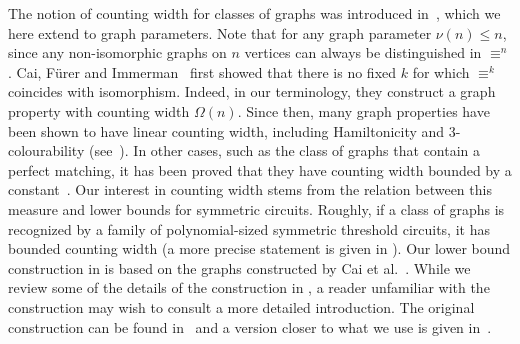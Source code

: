 \documentclass{toc}
\begin{document}
The notion of counting width for classes of
graphs was introduced in~\cite{DawarW17}, which we here extend to graph
parameters. Note that for any graph parameter $\nu(n) \leq n$, since
any non-isomorphic graphs on $n$ vertices can %
always  %
be distinguished in $\equiv^n$.
Cai, F\"{u}rer and Immerman~\cite{CFI92} first showed that there is no fixed $k$
for which $\equiv^k$ coincides with isomorphism. Indeed, in our terminology,
they construct a graph property with counting width $\Omega(n)$. Since then,
many graph properties have been shown to have linear counting width, including
Hamiltonicity and 3-colourability
(see~\cite{AtseriasDO19}). In other cases, such as the class of graphs that
contain a perfect matching, it has been proved that they have counting width
bounded by a constant~\cite{AndersonDH15}. Our interest in counting width stems
from the relation between this measure and lower bounds for symmetric circuits.
Roughly, if a class of graphs is recognized by a family of
polynomial-sized symmetric threshold circuits, it has bounded counting width (a
more precise statement is given in
).
Our lower bound construction in  is based on the
graphs constructed by Cai et al.~\cite{CFI92}. While we review some of the
details of the construction in , a reader unfamiliar
with the construction may wish to consult a more detailed introduction. The
original construction can be found in~\cite{CFI92} and a version closer to what
we use is given in~\cite{DR07}.
\end{document}
